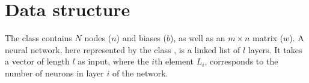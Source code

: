 \section*{Data structure}
The class  contains $N$ nodes ($n$) and biases ($b$), as well as an $m \times n$ matrix ($w$).
A neural network, here represented by the class , is a linked list of $l$ layers. It takes a vector  of length $l$ as input, where the $i$th element $L_i$, corresponds to the number of neurons in layer $i$ of the network.